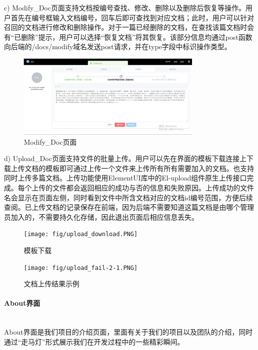 \documentclass[12pt]{article}
\newcommand{\myparagraph}[1]{\paragraph{#1}\mbox{}\\}
\begin{document}
c) Modify\_Doc页面支持文档按编号查找、修改、删除以及删除后恢复等操作。用户首先在编号框输入文档编号，回车后即可查找到对应文档；此时，用户可以针对召回的文档进行修改和删除操作。对于一篇已经删除的文档，在查找该篇文档时会有“已删除”提示，用户可以选择“恢复文档”将其恢复。该部分信息均通过post函数向后端的/docs/modify域名发送post请求，并在type字段中标识操作类型。

\begin{figure}[htbp]  %
    \centering  %
    \includegraphics[width=0.8\textwidth]{fig/modify_doc.png}  %
    \caption{Modify\_Doc页面}  %
    \label{fig:modify_doc}  %
\end{figure}

d) Upload\_Doc页面支持文件的批量上传。用户可以先在界面的模板下载连接上下载上传文档的模板即可通过上传一个文件来上传所有所有需要加入的文档。也支持同时上传多篇文档。上传功能使用ElementUI库中的El-upload组件原生上传接口完成。每个上传的文件都会返回相应的成功与否的信息和失败原因。上传成功的文件名会显示在页面左侧，同时看到文件中所含文档对应的文档id编号范围，方便后续查阅。已上传文档的记录保存在前端，因为后端不需要知道这篇文档是由哪个管理员加入的，不需要持久化存储，因此退出页面后相应信息丢失。
\begin{figure}[H]
	\begin{minipage}[t]{0.5\textwidth}
		\centering
		\texttt{[image: fig/upload\_download.PNG]}
		\caption{模板下载\label{fig:onlycontent}}
	\end{minipage}
	\qquad
	\begin{minipage}[t]{0.5\textwidth}
		\centering
		\texttt{[image: fig/upload\_fail-2-1.PNG]}
		\caption{文档上传结果示例\label{fig:titleandcontent}}
	\end{minipage}

\end{figure}

\myparagraph{About界面}

About界面是我们项目的介绍页面，里面有关于我们的项目以及团队的介绍，同时通过“走马灯”形式展示我们在开发过程中的一些精彩瞬间。
\end{document}

